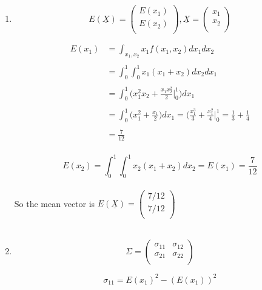 \documentclass[11pt,a4paper]{article}
\theoremstyle{definition}
\begin{document}
\begin{enumerate}
\item

$$E(\underline{X}) = 
\begin{pmatrix}
E(x_1)\\
E(x_2)\\
\end{pmatrix}
,   \underline{X}= \begin{pmatrix}
x_1\\
x_2\\
\end{pmatrix}
$$



\begin{align*}
E(x_1) & = \int_{x_1,x_2} x_1f(x_1,x_2)dx_1dx_2\\\\
       & = \int^1_0\int^1_0 x_1(x_1+x_2)dx_2dx_1\\\\
       & = \int^1_0\big(x^2_1x_2 +\frac{x_1x_2^2}{2}\Big|^1_0\big)dx_1\\\\
       & = \int^1_0\big(x^2_1 + \frac{x_1}{2}\big)dx_1=\big(\frac{x^3_1}{3}+ \frac{x^2_1}{4}\Big|^1_0=\frac{1}{3}+\frac{1}{4}\\\\
       & = \frac{7}{12}\\
\end{align*}


$$E(x_2) = \int^1_0\int^1_0 x_2(x_1+x_2)dx_2= E(x_1) = \frac{7}{12}$$\\

So the mean vector is $\displaystyle{E(\underline{X})= 
\begin{pmatrix}
7/12\\
7/12\\
\end{pmatrix}
}$\\\\


\item
$$\Sigma = 
\begin{pmatrix}
\sigma_{11} & \sigma_{12}\\
\sigma_{21} & \sigma_{22}\\
\end{pmatrix}
$$



$$\sigma_{11} = E(x_1)^2 - (E(x_1))^2$$


\end{enumerate}
\end{document}
